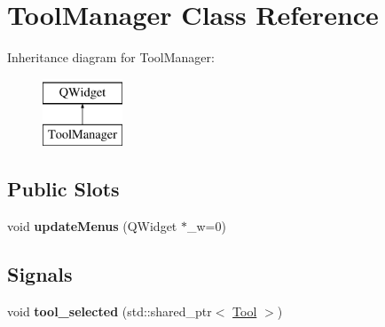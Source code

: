 \hypertarget{classToolManager}{}\section{Tool\+Manager Class Reference}
\label{classToolManager}
Inheritance diagram for Tool\+Manager\+:\begin{figure}[H]
\begin{center}
\leavevmode
\includegraphics[height=2.000000cm]{classToolManager}
\end{center}
\end{figure}
\subsection*{Public Slots}
\begin{DoxyCompactItemize}
\item 
\mbox{\label{classToolManager_a7ca8d129c5ec26d50650bd94962c3339}} 
void {\bfseries update\+Menus} (Q\+Widget $\ast$\+\_\+w=0)
\end{DoxyCompactItemize}
\subsection*{Signals}
\begin{DoxyCompactItemize}
\item 
\mbox{\label{classToolManager_aa2f5d9b90348fc40dbffe14561323c36}} 
void {\bfseries tool\+\_\+selected} (std\+::shared\+\_\+ptr$<$ \mbox{\hyperlink{classTool}{Tool}} $>$)
\end{DoxyCompactItemize}
